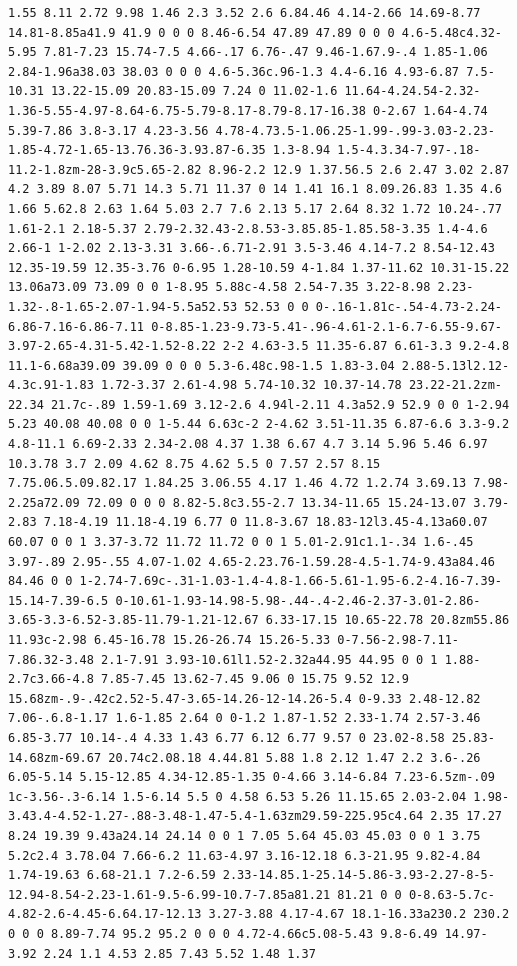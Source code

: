 \documentclass[11pt]{article}
\begin{document}
\begin{enumerate}
\begin{verbatim}
1.55 8.11 2.72 9.98 1.46 2.3 3.52 2.6 6.84.46 4.14-2.66 14.69-8.77 14.81-8.85a41.9 41.9 0 0 0 8.46-6.54 47.89 47.89 0 0 0 4.6-5.48c4.32-5.95 7.81-7.23 15.74-7.5 4.66-.17 6.76-.47 9.46-1.67.9-.4 1.85-1.06 2.84-1.96a38.03 38.03 0 0 0 4.6-5.36c.96-1.3 4.4-6.16 4.93-6.87 7.5-10.31 13.22-15.09 20.83-15.09 7.24 0 11.02-1.6 11.64-4.24.54-2.32-1.36-5.55-4.97-8.64-6.75-5.79-8.17-8.79-8.17-16.38 0-2.67 1.64-4.74 5.39-7.86 3.8-3.17 4.23-3.56 4.78-4.73.5-1.06.25-1.99-.99-3.03-2.23-1.85-4.72-1.65-13.76.36-3.93.87-6.35 1.3-8.94 1.5-4.3.34-7.97-.18-11.2-1.8zm-28-3.9c5.65-2.82 8.96-2.2 12.9 1.37.56.5 2.6 2.47 3.02 2.87 4.2 3.89 8.07 5.71 14.3 5.71 11.37 0 14 1.41 16.1 8.09.26.83 1.35 4.6 1.66 5.62.8 2.63 1.64 5.03 2.7 7.6 2.13 5.17 2.64 8.32 1.72 10.24-.77 1.61-2.1 2.18-5.37 2.79-2.32.43-2.8.53-3.85.85-1.85.58-3.35 1.4-4.6 2.66-1 1-2.02 2.13-3.31 3.66-.6.71-2.91 3.5-3.46 4.14-7.2 8.54-12.43 12.35-19.59 12.35-3.76 0-6.95 1.28-10.59 4-1.84 1.37-11.62 10.31-15.22 13.06a73.09 73.09 0 0 1-8.95 5.88c-4.58 2.54-7.35 3.22-8.98 2.23-1.32-.8-1.65-2.07-1.94-5.5a52.53 52.53 0 0 0-.16-1.81c-.54-4.73-2.24-6.86-7.16-6.86-7.11 0-8.85-1.23-9.73-5.41-.96-4.61-2.1-6.7-6.55-9.67-3.97-2.65-4.31-5.42-1.52-8.22 2-2 4.63-3.5 11.35-6.87 6.61-3.3 9.2-4.8 11.1-6.68a39.09 39.09 0 0 0 5.3-6.48c.98-1.5 1.83-3.04 2.88-5.13l2.12-4.3c.91-1.83 1.72-3.37 2.61-4.98 5.74-10.32 10.37-14.78 23.22-21.2zm-22.34 21.7c-.89 1.59-1.69 3.12-2.6 4.94l-2.11 4.3a52.9 52.9 0 0 1-2.94 5.23 40.08 40.08 0 0 1-5.44 6.63c-2 2-4.62 3.51-11.35 6.87-6.6 3.3-9.2 4.8-11.1 6.69-2.33 2.34-2.08 4.37 1.38 6.67 4.7 3.14 5.96 5.46 6.97 10.3.78 3.7 2.09 4.62 8.75 4.62 5.5 0 7.57 2.57 8.15 7.75.06.5.09.82.17 1.84.25 3.06.55 4.17 1.46 4.72 1.2.74 3.69.13 7.98-2.25a72.09 72.09 0 0 0 8.82-5.8c3.55-2.7 13.34-11.65 15.24-13.07 3.79-2.83 7.18-4.19 11.18-4.19 6.77 0 11.8-3.67 18.83-12l3.45-4.13a60.07 60.07 0 0 1 3.37-3.72 11.72 11.72 0 0 1 5.01-2.91c1.1-.34 1.6-.45 3.97-.89 2.95-.55 4.07-1.02 4.65-2.23.76-1.59.28-4.5-1.74-9.43a84.46 84.46 0 0 1-2.74-7.69c-.31-1.03-1.4-4.8-1.66-5.61-1.95-6.2-4.16-7.39-15.14-7.39-6.5 0-10.61-1.93-14.98-5.98-.44-.4-2.46-2.37-3.01-2.86-3.65-3.3-6.52-3.85-11.79-1.21-12.67 6.33-17.15 10.65-22.78 20.8zm55.86 11.93c-2.98 6.45-16.78 15.26-26.74 15.26-5.33 0-7.56-2.98-7.11-7.86.32-3.48 2.1-7.91 3.93-10.61l1.52-2.32a44.95 44.95 0 0 1 1.88-2.7c3.66-4.8 7.85-7.45 13.62-7.45 9.06 0 15.75 9.52 12.9 15.68zm-.9-.42c2.52-5.47-3.65-14.26-12-14.26-5.4 0-9.33 2.48-12.82 7.06-.6.8-1.17 1.6-1.85 2.64 0 0-1.2 1.87-1.52 2.33-1.74 2.57-3.46 6.85-3.77 10.14-.4 4.33 1.43 6.77 6.12 6.77 9.57 0 23.02-8.58 25.83-14.68zm-69.67 20.74c2.08.18 4.44.81 5.88 1.8 2.12 1.47 2.2 3.6-.26 6.05-5.14 5.15-12.85 4.34-12.85-1.35 0-4.66 3.14-6.84 7.23-6.5zm-.09 1c-3.56-.3-6.14 1.5-6.14 5.5 0 4.58 6.53 5.26 11.15.65 2.03-2.04 1.98-3.43.4-4.52-1.27-.88-3.48-1.47-5.4-1.63zm29.59-225.95c4.64 2.35 17.27 8.24 19.39 9.43a24.14 24.14 0 0 1 7.05 5.64 45.03 45.03 0 0 1 3.75 5.2c2.4 3.78.04 7.66-6.2 11.63-4.97 3.16-12.18 6.3-21.95 9.82-4.84 1.74-19.63 6.68-21.1 7.2-6.59 2.33-14.85.1-25.14-5.86-3.93-2.27-8-5-12.94-8.54-2.23-1.61-9.5-6.99-10.7-7.85a81.21 81.21 0 0 0-8.63-5.7c-4.82-2.6-4.45-6.64.17-12.13 3.27-3.88 4.17-4.67 18.1-16.33a230.2 230.2 0 0 0 8.89-7.74 95.2 95.2 0 0 0 4.72-4.66c5.08-5.43 9.8-6.49 14.97-3.92 2.24 1.1 4.53 2.85 7.43 5.52 1.48 1.37 
\end{verbatim}
\end{enumerate}
\end{document}

